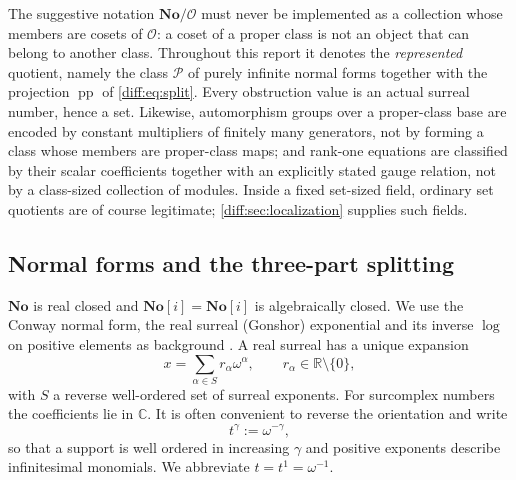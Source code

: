 \documentclass[11pt,letterpaper]{article}
\numberwithin{equation}{section}
\theoremstyle{definition}
\theoremstyle{remark}
\newcommand{\No}{\mathbf{No}}
\newcommand{\SC}{\mathbf{No}[i]}
\newcommand{\R}{\mathbb R}
\newcommand{\C}{\mathbb C}
\newcommand{\Ofin}{\mathcal O}
\newcommand{\Pcl}{\mathcal P}
\newcommand{\pp}{\operatorname{pp}}
\begin{document}
\begin{warning}
\label{diff:warn:cosets}
The suggestive notation $\No/\Ofin$ must never be implemented as a collection
whose members are cosets of $\Ofin$: a coset of a proper class is not an
object that can belong to another class. Throughout this report it denotes the
\emph{represented} quotient, namely the class $\Pcl$ of purely infinite normal
forms together with the projection $\pp$ of \cref{diff:eq:split}. Every
obstruction value is an actual surreal number, hence a set. Likewise,
automorphism groups over a proper-class base are encoded by constant
multipliers of finitely many generators, not by forming a class whose members
are proper-class maps; and rank-one equations are classified by their scalar
coefficients together with an explicitly stated gauge relation, not by a
class-sized collection of modules. Inside a fixed set-sized field, ordinary
set quotients are of course legitimate; \cref{diff:sec:localization} supplies
such fields.
\end{warning}

\subsection{Normal forms and the three-part splitting}
\label{diff:sub:normalforms}

$\No$ is real closed and $\SC=\No[i]$ is algebraically closed. We use the
Conway normal form, the real surreal (Gonshor) exponential and its inverse
$\log$ on positive elements as background \cite{BM,Gonshor}. A real surreal
has a unique expansion
\begin{equation}\label{diff:eq:normal}
 x=\sum_{\alpha\in S}r_{\alpha}\omega^{\alpha},
 \qquad r_{\alpha}\in\R\setminus\{0\},
\end{equation}
with $S$ a reverse well-ordered set of surreal exponents. For surcomplex
numbers the coefficients lie in $\C$. It is often convenient to reverse the
orientation and write
\begin{equation}\label{diff:eq:tmonomial}
 t^{\gamma}:=\omega^{-\gamma},
\end{equation}
so that a support is well ordered in increasing $\gamma$ and positive
exponents describe infinitesimal monomials. We abbreviate $t=t^{1}=\omega^{-1}$.
\end{document}

